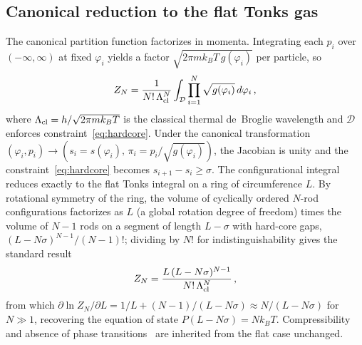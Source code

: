 \documentclass[aps,pre,twocolumn,superscriptaddress,longbibliography,floatfix]{revtex4-2}
\begin{document}
\subsection{Canonical reduction to the flat Tonks gas}

The canonical partition function factorizes in momenta.
Integrating each $p_i$ over $(-\infty,\infty)$ at fixed $\varphi_i$ yields a factor
$\sqrt{2\pi m k_BT\,g(\varphi_i)}$ per particle, so
\begin{equation}
  Z_N = \frac{1}{N!\,\Lambda_{\rm cl}^N}
        \int_{\mathcal{D}} \prod_{i=1}^N \sqrt{g(\varphi_i)}\,d\varphi_i\,,
  \label{eq:ZN_config}
\end{equation}
where $\Lambda_{\rm cl}=h/\sqrt{2\pi m k_BT}$ is the classical thermal de~Broglie wavelength
and $\mathcal{D}$ enforces constraint~\eqref{eq:hardcore}.
Under the canonical transformation $(\varphi_i,p_i)\to(s_i=s(\varphi_i),\,\pi_i=p_i/\sqrt{g(\varphi_i)})$,
the Jacobian is unity and the constraint~\eqref{eq:hardcore} becomes $s_{i+1}-s_i\geq\sigma$.
The configurational integral reduces exactly to the flat Tonks integral on a ring of
circumference $L$.
By rotational symmetry of the ring, the volume of cyclically ordered $N$-rod
configurations factorizes as $L$ (a global rotation degree of freedom) times the volume
of $N-1$ rods on a segment of length $L-\sigma$ with hard-core gaps, $(L-N\sigma)^{N-1}/(N-1)!$;
dividing by $N!$ for indistinguishability gives the standard
result~\cite{Tonks1936,HansenMcDonald2006}
\begin{equation}
  Z_N = \frac{L\,(L-N\sigma)^{N-1}}{N!\,\Lambda_{\rm cl}^N}\,,
  \label{eq:ZN_flat}
\end{equation}
from which $\partial\ln Z_N/\partial L = 1/L + (N-1)/(L-N\sigma)\approx N/(L-N\sigma)$ for $N\gg 1$,
recovering the equation of state $P(L-N\sigma)=Nk_BT$.
Compressibility and absence of phase transitions~\cite{vanHove1950,CuestaGHD2004} are
inherited from the flat case unchanged.
\end{document}
